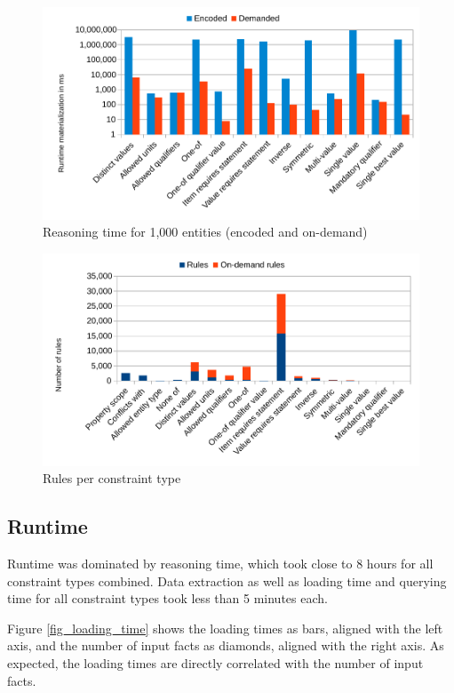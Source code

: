 \documentclass[hyperref,bachelorofscience,fleqn]{cgvpub}
\begin{document}
\begin{figure}
\includegraphics[width=\linewidth]{images/inequality1000.pdf}
\caption{Reasoning time for 1,000 entities (encoded and on-demand)}\label{fig_inequality}
\end{figure}

\begin{figure}
\includegraphics[width=\linewidth]{images/Rules.pdf}
\caption{Rules per constraint type}\label{fig_inequality}
\end{figure}

\subsection{Runtime}
Runtime was dominated by reasoning time, which took close to 8 hours for all constraint types combined. Data extraction as well as loading time and querying time for all constraint types took less than 5 minutes each.

Figure \ref{fig_loading_time} shows the loading times as bars, aligned with the left axis, and the number of input facts as diamonds, aligned with the right axis. As expected, the loading times are directly correlated with the number of input facts.
\end{document}
